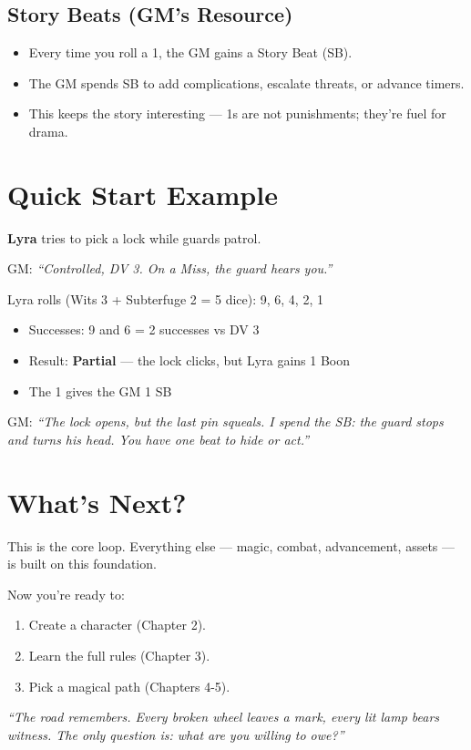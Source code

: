 \subsection*{Story Beats (GM's Resource)}
\begin{itemize}
  \item Every time you roll a 1, the GM gains a Story Beat (SB).
  \item The GM spends SB to add complications, escalate threats, or advance timers.
  \item This keeps the story interesting — 1s are not punishments; they're fuel for drama.
\end{itemize}

\section{Quick Start Example}

\textbf{Lyra} tries to pick a lock while guards patrol.

GM: \textit{``Controlled, DV 3. On a Miss, the guard hears you.''}

Lyra rolls (Wits 3 + Subterfuge 2 = 5 dice): 9, 6, 4, 2, 1

\begin{itemize}
  \item Successes: 9 and 6 = 2 successes vs DV 3
  \item Result: \textbf{Partial} — the lock clicks, but Lyra gains 1 Boon
  \item The 1 gives the GM 1 SB
\end{itemize}

GM: \textit{``The lock opens, but the last pin squeals. I spend the SB: the guard stops and turns his head. You have one beat to hide or act.''}

\section{What's Next?}

This is the core loop. Everything else — magic, combat, advancement, assets — is built on this foundation.

Now you're ready to:
\begin{enumerate}
  \item Create a character (Chapter 2).
  \item Learn the full rules (Chapter 3).
  \item Pick a magical path (Chapters 4-5).
\end{enumerate}

\textit{``The road remembers. Every broken wheel leaves a mark, every lit lamp bears witness. The only question is: what are you willing to owe?''}
